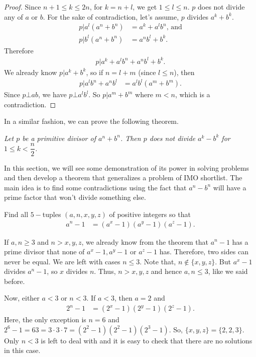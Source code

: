 \documentclass{subfile}
\begin{document}
		\begin{proof}
			Since $n+1\leq k\leq2n$, for $k=n+l$, we get $1\leq l\leq n$. $p$ does not divide any of $a$ or $b$. For the sake of contradiction, let's assume, $p$ divides $a^k+b^k$.
				\begin{align*}
					p | a^l(a^n+b^n) &= a^k+a^lb^n\text {, and}\\
					p |b^l(a^n+b^n) &= a^nb^l+b^k.
				\end{align*}
			Therefore
			\begin{align*}
				p |a^k+a^lb^n+a^nb^l+b^k.
			\end{align*}
			We already know $p|a^k+b^k$, so if $n=l+m$ (since $l\leq n$), then
				\begin{align*}
					p|a^lb^n+a^nb^l & = a^lb^l(a^m+b^m).
				\end{align*}
			Since $p\bot ab$, we have $p\bot a^lb^l$. So $p|a^m+b^m$ where $m< n$, which is a contradiction.
		\end{proof}
	In a similar fashion, we can prove the following theorem.
		\begin{theorem}\slshape
			Let $p$ be a primitive divisor of $a^n+b^n$. Then $p$ does not divide $a^k-b^k$ for $1\leq k<\dfrac{n}{2}$.
		\end{theorem}
		
	In this section, we will see some demonstration of its power in solving problems and then develop a theorem that generalizes a problem of IMO shortlist. The main idea is to find some contradictions using the fact that $a^n-b^n$ will have a prime factor that won't divide something else.
		\begin{problem}
			Find all $5-$tuples $(a,n,x,y,z)$ of positive integers so that
				\begin{align*}
					a^n-1 & = (a^x-1)(a^y-1)(a^z-1).
				\end{align*}
		\end{problem}
		
		\begin{solution}
			If $a,n\geq3$ and $n>x,y,z$, we already know from the theorem that $a^n-1$ has a prime divisor that none of $a^x-1,a^y-1$ or $a^z-1$ has. Therefore, two sides can never be equal. We are left with cases $n\leq3$. Note that, $n\notin\{x,y,z\}$. But $a^x-1$ divides $a^n-1$, so $x$ divides $n$. Thus, $n>x,y,z$ and hence $a,n\leq3$, like we said before.
			
			Now, either $a<3$ or $n<3$. If $a<3$, then $a=2$ and
				\begin{align*}
					2^n-1 & = (2^x-1)(2^y-1)(2^z-1).
				\end{align*}
			Here, the only exception is $n=6$ and $2^6-1=63=3\cdot3\cdot7=(2^2-1)(2^2-1)(2^3-1)$. So, $\{x,y,z\}=\{2,2,3\}$. Only $n<3$ is left to deal with and it is easy to check that there are no solutions in this case.
		\end{solution}
		
\end{document}
